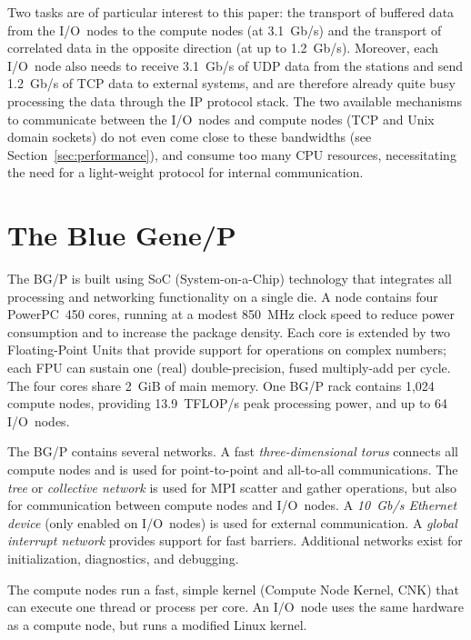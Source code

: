 \documentclass[journal]{IEEEtran}
\begin{document}
Two tasks are of particular interest to this paper: the transport of buffered
data from the I/O~nodes to the compute nodes (at 3.1~Gb/s) and the transport
of correlated data in the opposite direction (at up to 1.2~Gb/s).
Moreover, each I/O~node also needs to receive 3.1~Gb/s of UDP data from the
stations and send 1.2~Gb/s of TCP data to external systems, and are therefore
already quite busy processing the data through the IP protocol stack.
The two available mechanisms to communicate between the
I/O~nodes and compute nodes (TCP and Unix domain sockets) do not even come
close to these bandwidths (see Section~\ref{sec:performance}), and consume
too many CPU resources,
necessitating the need for a light-weight protocol for internal communication.


\section{The Blue Gene/P}
\label{sec:BG/P}



The BG/P is built using SoC (System-on-a-Chip) technology that integrates
all processing and networking functionality on a single die.
A node contains four PowerPC~450 cores, running at a modest 850~MHz clock
speed to reduce power consumption and to increase the package density.
Each core is extended by two Floating-Point Units that provide support for
operations on complex numbers; each FPU can sustain one (real) double-precision,
fused multiply-add per cycle.
The four cores share 2~GiB of main memory.
One BG/P rack contains 1,024 compute nodes, providing 13.9~TFLOP/s peak
processing power, and up to 64 I/O~nodes.

The BG/P contains several networks.
A fast \emph{three-dimensional torus\/} connects all compute nodes and is used
for point-to-point and all-to-all communications.
The \emph{tree\/} or \emph{collective network\/} is used for MPI scatter and
gather operations, but also for communication between compute nodes and
I/O~nodes.
A \emph{10~Gb/s Ethernet device\/} (only enabled on I/O~nodes) is used for
external communication.
A \emph{global interrupt network\/} provides support for fast barriers.
Additional networks exist for initialization, diagnostics, and debugging.

The compute nodes run a fast, simple kernel (Compute Node Kernel, CNK) that
can execute one thread or process per core.
An I/O~node uses the same hardware as a compute node, but runs a modified
Linux kernel.
\end{document}
